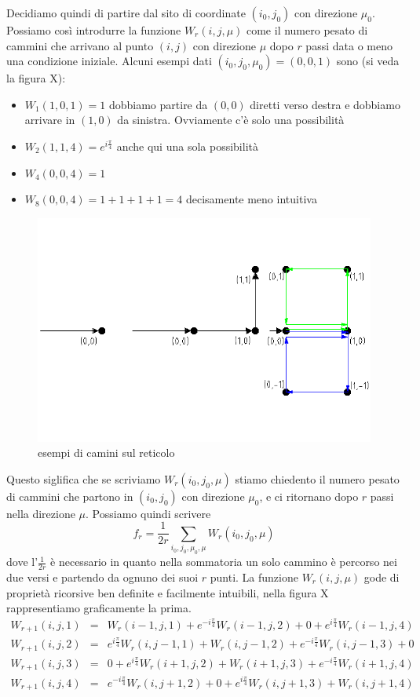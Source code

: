 \documentclass[11pt]{article}
\begin{document}
Decidiamo quindi di partire dal sito di coordinate $(i_0,j_0)$ con direzione $\mu_0$. Possiamo così introdurre la funzione $W_r(i,j,\mu)$ come il numero pesato di cammini che arrivano al punto $(i,j)$ con direzione $\mu$ dopo $r$ passi data o meno una condizione iniziale. Alcuni esempi dati $(i_0,j_0,\mu_0)=(0,0,1)$ sono (si veda la figura X):
\begin{itemize}
\item{$W_1(1,0,1)=1$ dobbiamo partire da $(0,0)$ diretti verso destra e dobbiamo arrivare in $(1,0)$ da sinistra. Ovviamente c'è solo una possibilità}
\item{$W_2(1,1,4)=e^{i\frac{\pi}{4}}$ anche qui una sola possibilità}
\item{$W_4(0,0,4)=1$}
\item{$W_8(0,0,4)=1+1+1+1=4$ decisamente meno intuitiva}
\end{itemize}
\begin{figure}[h]
\centering
\includegraphics[width=0.8\columnwidth]{v6}
\caption{esempi di camini sul reticolo}
\label{v6}
\end{figure}
 Questo siglifica che se scriviamo $W_r(i_0,j_0,\mu)$ stiamo chiedento il numero pesato di cammini che partono in $(i_0,j_0)$ con direzione $\mu_0$, e ci ritornano dopo $r$ passi nella direzione $\mu$. Possiamo quindi scrivere
 $$ f_r=\frac{1}{2r}\sum_{i_0,j_0,\mu_0,\mu}W_r(i_0,j_0,\mu)
 $$
dove l'$\frac{1}{2r}$ è necessario in quanto nella sommatoria un solo cammino è percorso nei due versi e partendo da ognuno dei suoi $r$ punti. 
La funzione $W_r(i,j,\mu)$ gode di proprietà ricorsive ben definite e facilmente intuibili, nella figura X rappresentiamo graficamente la prima.
$$
\begin{array}{lcl} 
W_{r+1}(i,j,1) & = & W_r(i-1,j,1)+e^{-i\frac{\pi}{4}}W_r(i-1,j,2)+0+e^{i\frac{\pi}{4}}W_r(i-1,j,4) \\
W_{r+1}(i,j,2) & = & e^{i\frac{\pi}{4}}W_r(i,j-1,1)+W_r(i,j-1,2)+e^{-i\frac{\pi}{4}}W_r(i,j-1,3)+0 \\
W_{r+1}(i,j,3) & = & 0+e^{i\frac{\pi}{4}}W_r(i+1,j,2)+W_r(i+1,j,3)+e^{-i\frac{\pi}{4}}W_r(i+1,j,4) \\
W_{r+1}(i,j,4) & = & e^{-i\frac{\pi}{4}}W_r(i,j+1,2)+0+e^{i\frac{\pi}{4}}W_r(i,j+1,3)+W_r(i,j+1,4)
\end{array} 
$$
\end{document}

